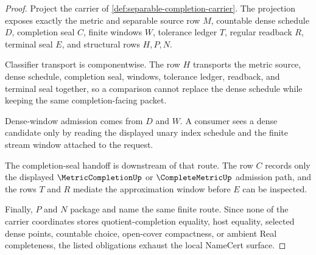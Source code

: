 \begin{proof}
Project the carrier of \autoref{def:separable-completion-carrier}. The projection exposes exactly the metric and separable source row $M$, countable dense schedule $D$, completion seal $C$, finite windows $W$, tolerance ledger $T$, regular readback $R$, terminal seal $E$, and structural rows $H,P,N$.

Classifier transport is componentwise. The row $H$ transports the metric source, dense schedule, completion seal, windows, tolerance ledger, readback, and terminal seal together, so a comparison cannot replace the dense schedule while keeping the same completion-facing packet.

Dense-window admission comes from $D$ and $W$. A consumer sees a dense candidate only by reading the displayed unary index schedule and the finite stream window attached to the request.

The completion-seal handoff is downstream of that route. The row $C$ records only the displayed $\MetricCompletionUp$ or $\CompleteMetricUp$ admission path, and the rows $T$ and $R$ mediate the approximation window before $E$ can be inspected.

Finally, $P$ and $N$ package and name the same finite route. Since none of the carrier coordinates stores quotient-completion equality, host equality, selected dense points, countable choice, open-cover compactness, or ambient Real completeness, the listed obligations exhaust the local NameCert surface.
\end{proof}

